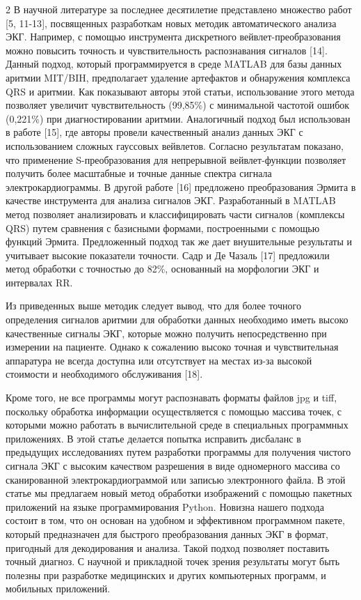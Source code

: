 \begin{multicols}{2}
В научной литературе за последнее десятилетие представлено множество
работ {[}5, 11-13{]}, посвященных разработкам новых методик
автоматического анализа ЭКГ. Например, с помощью инструмента дискретного
вейвлет-преобразования можно повысить точность и чувствительность
распознавания сигналов {[}14{]}. Данный подход, который программируется
в среде MATLAB для базы данных аритмии MIT/BIH, предполагает удаление
артефактов и обнаружения комплекса QRS и аритмии. Как показывают авторы
этой статьи, использование этого метода позволяет увеличит
чувствительность (99,85\%) с минимальной частотой ошибок (0,221\%) при
диагностировании аритмии. Аналогичный подход был использован в работе
{[}15{]}, где авторы провели качественный анализ данных ЭКГ с
использованием сложных гауссовых вейвлетов. Согласно результатам
показано, что применение S-преобразования для непрерывной
вейвлет-функции позволяет получить более масштабные и точные данные
спектра сигнала электрокардиограммы. В другой работе {[}16{]} предложено
преобразования Эрмита в качестве инструмента для анализа сигналов ЭКГ.
Разработанный в MATLAB метод позволяет анализировать и классифицировать
части сигналов (комплексы QRS) путем сравнения с базисными формами,
построенными с помощью функций Эрмита. Предложенный подход так же дает
внушительные результаты и учитывает высокие показатели точности. Садр и
Де Чазаль {[}17{]} предложили метод обработки с точностью до 82\%,
основанный на морфологии ЭКГ и интервалах RR.

Из приведенных выше методик следует вывод, что для более точного
определения сигналов аритмии для обработки данных необходимо иметь
высоко качественные сигналы ЭКГ, которые можно получить непосредственно
при измерении на пациенте. Однако к сожалению высоко точная и
чувствительная аппаратура не всегда доступна или отсутствует на местах
из-за высокой стоимости и необходимого обслуживания {[}18{]}.

Кроме того, не все программы могут распознавать форматы файлов jpg и
tiff, поскольку обработка информации осуществляется с помощью массива
точек, с которыми можно работать в вычислительной среде в специальных
программных приложениях. В этой статье делается попытка исправить
дисбаланс в предыдущих исследованиях путем разработки программы для
получения чистого сигнала ЭКГ с высоким качеством разрешения в виде
одномерного массива со сканированной электрокардиограммой или записью
электронного файла. В этой статье мы предлагаем новый метод обработки
изображений с помощью пакетных приложений на языке программирования
Python. Новизна нашего подхода состоит в том, что он основан на удобном
и эффективном программном пакете, который предназначен для быстрого
преобразования данных ЭКГ в формат, пригодный для декодирования и
анализа. Такой подход позволяет поставить точный диагноз. С научной и
прикладной точек зрения результаты могут быть полезны при разработке
медицинских и других компьютерных программ, и мобильных приложений.


\end{multicols}
